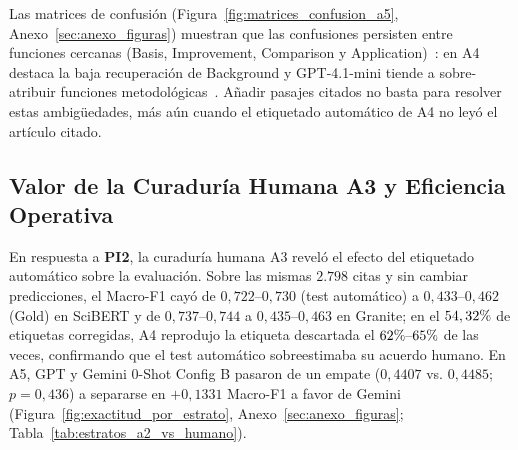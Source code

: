 \documentclass[conference]{IEEEtran}
\newcommand{\pct}{\mbox{\symbol{37}}}
\begin{document}
Las matrices de confusión (Figura~\ref{fig:matrices_confusion_a5}, Anexo~\ref{sec:anexo_figuras}) muestran que las confusiones persisten entre funciones cercanas (Basis, Improvement, Comparison y Application)~\cite{lauscher2022multicite}: en A4 destaca la baja recuperación de Background y GPT-4.1-mini tiende a sobre-atribuir funciones metodológicas~\cite{fogelson2025llms}. Añadir pasajes citados no basta para resolver estas ambigüedades, más aún cuando el etiquetado automático de A4 no leyó el artículo citado.

\subsection{Valor de la Curaduría Humana A3 y Eficiencia Operativa}

En respuesta a \textbf{PI2}, la curaduría humana A3 reveló el efecto del etiquetado automático sobre la evaluación. Sobre las mismas $2.798$ citas y sin cambiar predicciones, el Macro-F1 cayó de $0,722\text{--}0,730$ (test automático) a $0,433\text{--}0,462$ (Gold) en SciBERT y de $0,737\text{--}0,744$ a $0,435\text{--}0,463$ en Granite; en el $54,32\pct{}$ de etiquetas corregidas, A4 reprodujo la etiqueta descartada el $62\pct{}\text{--}65\pct{}$ de las veces, confirmando que el test automático sobreestimaba su acuerdo humano. En A5, GPT y Gemini 0-Shot Config B pasaron de un empate ($0,4407$ vs. $0,4485$; $p=0,436$) a separarse en $+0,1331$ Macro-F1 a favor de Gemini (Figura~\ref{fig:exactitud_por_estrato}, Anexo~\ref{sec:anexo_figuras}; Tabla~\ref{tab:estratos_a2_vs_humano}).
\end{document}
